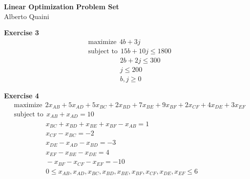 \documentclass[letterpaper,12pt]{article}
\theoremstyle{definition}
\begin{document}
\begin{flushleft}
  \textbf{\large{Linear Optimization Problem Set}} \\
  Alberto Quaini
\end{flushleft}

\textbf{Exercise 3}
\begin{align*}
  &\text{maximize} \ \ 4b + 3j \\
  &\text{subject to} \ \ 15b + 10j \leq 1800 \\
  &\qquad \qquad \ \ \  2b + 2j \leq 300 \\
  &\qquad \qquad \ \ \  j \leq 200 \\
  &\qquad \qquad \ \ \  b, j \geq 0
\end{align*}

\textbf{Exercise 4}
\begin{align*}
  &\text{maximize} \ \ 2x_{AB} + 5x_{AD} + 5x_{BC} + 2x_{BD} + 7x_{BE} + 9x_{BF} + 2x_{CF} + 4x_{DE} + 3x_{EF} \\
  &\text{subject to} \ \ x_{AB} + x_{AD} = 10 \\
  &\qquad \qquad \ \ \ x_{BC} + x_{BD} + x_{BE} + x_{BF} - x_{AB} = 1 \\
  &\qquad \qquad \ \ \ x_{CF} - x_{BC} = -2 \\
  &\qquad \qquad \ \ \ x_{DE} - x_{AD} - x_{BD} = -3 \\
  &\qquad \qquad \ \ \ x_{EF} - x_{BE} - x_{DE} = 4 \\
  &\qquad \qquad \ \ \ -x_{BF} - x_{CF} - x_{EF} = -10 \\
  &\qquad \qquad \ \ \ 0 \leq x_{AB}, x_{AD}, x_{BC}, x_{BD}, x_{BE}, x_{BF}, x_{CF}, x_{DE}, x_{EF} \leq 6
\end{align*}
\end{document}
